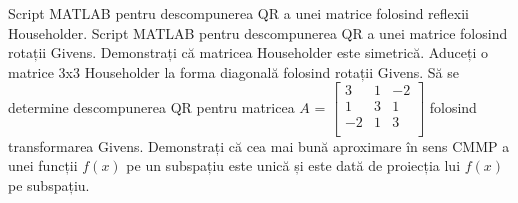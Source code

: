 \documentclass{exam}
\begin{document}
\begin{questions}
	\boxedpoints
	\pointsinmargin

	\question Script MATLAB pentru descompunerea QR a unei matrice folosind reflexii Householder.
	\question Script MATLAB pentru descompunerea QR a unei matrice folosind rotații Givens.
	\question Demonstrați că matricea Householder este simetrică.
	\question Aduceți o matrice 3x3 Householder la forma diagonală folosind
	rotații Givens.
	\question Să se determine descompunerea QR pentru matricea
	$A$ = $\begin{bmatrix}
			3  & 1 & -2 \\
			1  & 3 & 1  \\
			-2 & 1 & 3  \\
		\end{bmatrix}$ folosind transformarea Givens.
	\question Demonstrați că cea mai bună aproximare în sens CMMP a unei funcții
	$f(x)$ pe un subspațiu este unică și este dată de proiecția lui $f(x)$ pe
	subspațiu.
\end{questions}



\end{document}
